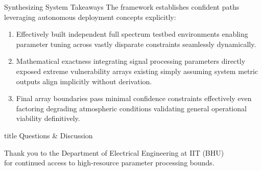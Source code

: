\documentclass[10pt,aspectratio=169]{beamer}
\begin{document}
\begin{frame}{Synthesizing System Takeaways}
    The framework establishes confident paths leveraging autonomous deployment concepts explicitly:
    \vspace{3mm}
    \begin{enumerate}
        \item Effectively built independent full spectrum testbed environments enabling parameter tuning across vastly disparate constraints seamlessly dynamically.
        \item Mathematical exactness integrating signal processing parameters directly exposed extreme vulnerability arrays existing simply assuming system metric outputs align implicitly without derivation.
        \item Final array boundaries pass minimal confidence constraints effectively even factoring degrading atmospheric conditions validating general operational viability definitively.
    \end{enumerate}
\end{frame}

\begin{frame}
    \vfill
    \centering
    \begin{beamercolorbox}[sep=8pt,center,shadow=true,rounded=true]{title}
      Questions \& Discussion\par%
    \end{beamercolorbox}
    
    \vspace{8mm}
    \normalsize
    Thank you to the Department of Electrical Engineering at IIT (BHU)\\ for continued access to high-resource parameter processing bounds.
    \vfill
\end{frame}
\end{document}
